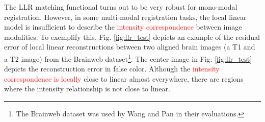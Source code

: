 The LLR matching functional turns out to be very robust for mono-modal registration. However, in some multi-modal registration tasks, the local linear model is insufficient to describe the \textcolor{red}{intensity correspondence} between image modalities. To exemplify this, Fig. \ref{fig:llr_test} depicts an example of the residual error of local linear reconstructions between two aligned brain images (a T1 and a T2 image) from the Brainweb \cite{Cocosco1997} dataset\footnote{The Brainweb dataset was used by Wang and Pan \cite{Wang2014} in their evaluations.}. The center image in Fig. \ref{fig:llr_test} depicts the reconstruction error in false color. Although the \textcolor{red}{ intensity correspondence is locally} close to linear almost everywhere, there are regions where the intensity relationship is not close to linear.\\


